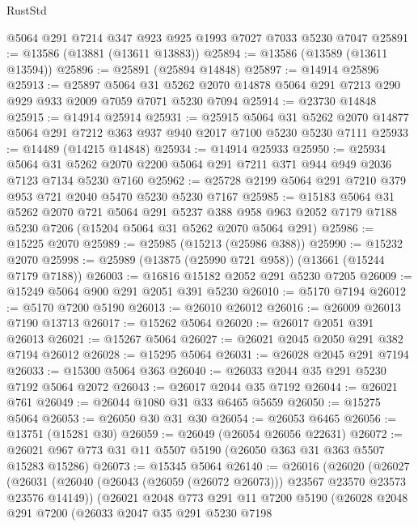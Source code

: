 \begin{lexlean}{RustStd}
\begin{coremodule}
    @5064
    @291
    @7214
    @347
    @923
    @925
    @1993
    @7027
    @7033
    @5230
    @7047
@25891 := @13586 (@13881 (@13611 @13883))
@25894 := @13586 (@13589 (@13611 @13594))
@25896 := @25891 (@25894 @14848)
@25897 := @14914 @25896
@25913 := @25897
    @5064
    @31
    @5262
    @2070
    @14878
    @5064
    @291
    @7213
    @290
    @929
    @933
    @2009
    @7059
    @7071
    @5230
    @7094
@25914 := @23730 @14848
@25915 := @14914 @25914
@25931 := @25915
    @5064
    @31
    @5262
    @2070
    @14877
    @5064
    @291
    @7212
    @363
    @937
    @940
    @2017
    @7100
    @5230
    @5230
    @7111
@25933 := @14489 (@14215 @14848)
@25934 := @14914 @25933
@25950 := @25934
    @5064
    @31
    @5262
    @2070
    @2200
    @5064
    @291
    @7211
    @371
    @944
    @949
    @2036
    @7123
    @7134
    @5230
    @7160
@25962 := @25728 @2199 @5064 @291 @7210 @379 @953 @721 @2040 @5470 @5230 @5230 @7167
@25985 := @15183
    @5064
    @31
    @5262
    @2070
    @721
    @5064
    @291
    @5237
    @388
    @958
    @963
    @2052
    @7179
    @7188
    @5230
    @7206
    (@15204 @5064 @31 @5262 @2070 @5064 @291)
@25986 := @15225 @2070
@25989 := @25985 (@15213 (@25986 @388))
@25990 := @15232 @2070
@25998 := @25989 (@13875 (@25990 @721 @958)) (@13661 (@15244 @7179 @7188))
@26003 := @16816 @15182 @2052 @291 @5230 @7205
@26009 := @15249 @5064 @900 @291 @2051 @391 @5230
@26010 := @5170 @7194
@26012 := @5170 @7200 @5190
@26013 := @26010 @26012
@26016 := @26009 @26013 @7190 @13713
@26017 := @15262 @5064
@26020 := @26017 @2051 @391 @26013
@26021 := @15267 @5064
@26027 := @26021 @2045 @2050 @291 @382 @7194 @26012
@26028 := @15295 @5064
@26031 := @26028 @2045 @291 @7194
@26033 := @15300 @5064 @363
@26040 := @26033 @2044 @35 @291 @5230 @7192 @5064 @2072
@26043 := @26017 @2044 @35 @7192
@26044 := @26021 @761
@26049 := @26044 @1080 @31 @33 @6465 @5659
@26050 := @15275 @5064
@26053 := @26050 @30 @31 @30
@26054 := @26053 @6465
@26056 := @13751 (@15281 @30)
@26059 := @26049 (@26054 @26056 @22631)
@26072 := @26021 @967 @773 @31 @11 @5507 @5190 (@26050 @363 @31 @363 @5507 @15283 @15286)
@26073 := @15345 @5064
@26140 := @26016
    (@26020
      (@26027
        (@26031 (@26040 (@26043 (@26059 (@26072 @26073))) @23567 @23570 @23573 @23576 @14149))
        (@26021
          @2048
          @773
          @291
          @11
          @7200
          @5190
          (@26028
            @2048
            @291
            @7200
            (@26033
              @2047
              @35
              @291
              @5230
              @7198

\end{coremodule}
\end{lexlean}
